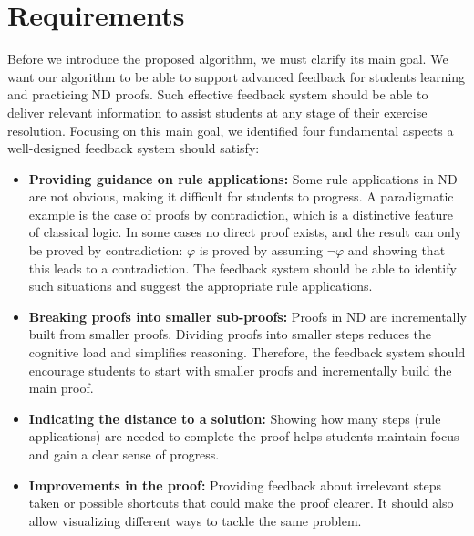 \section{Requirements}
Before we introduce the proposed algorithm, we must clarify its main goal. We want our algorithm to be able to support advanced feedback for students learning and practicing ND proofs. Such effective feedback system should be able to deliver relevant information to assist students at any stage of their exercise resolution. Focusing on this main goal, we identified four fundamental aspects a well-designed feedback system should satisfy:

\begin{itemize}

\item \textbf {Providing guidance on rule applications:} Some rule applications in ND are not obvious, making it difficult for students to progress. A paradigmatic example is the case of proofs by contradiction, which is a distinctive feature of classical logic. In some cases no direct proof exists, and the result can only be proved by contradiction: \(\varphi\) is proved by assuming \(\neg \varphi\) and showing that this leads to a contradiction. The feedback system should be able to identify such situations and suggest the appropriate rule applications.

\item \textbf {Breaking proofs into smaller sub-proofs:} Proofs in ND are incrementally built from smaller proofs. Dividing proofs into smaller steps reduces the cognitive load and simplifies reasoning. Therefore, the feedback system should encourage students to start with smaller proofs and incrementally build the main proof. 

\item \textbf{Indicating the distance to a solution:} Showing how many steps (rule applications) are needed to complete the proof helps students maintain focus and gain a clear sense of progress.

\item \textbf{Improvements in the proof:} Providing feedback about irrelevant steps taken or possible shortcuts that could make the proof clearer. It should also allow visualizing different ways to tackle the same problem.

\end{itemize}
